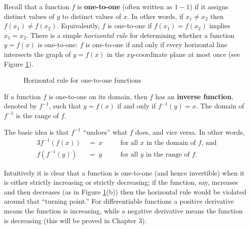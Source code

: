 Recall that a function $f$ is \textbf{one-to-one} (often
written as $1-1$) if it assigns distinct values of $y$ to distinct values of
$x$. In other words, if $x_1 \ne x_2$ then $f(x_1 ) \ne f(x_2 )$. Equivalently,
$f$ is one-to-one if $f(x_1 ) = f(x_2 )$ implies $x_1 = x_2$. There is a simple
\emph{horizontal rule} for determining whether a function $y=f(x)$ is
one-to-one: $f$ is one-to-one if and only if every horizontal line intersects
the graph of $y=f(x)$ in the $xy$-coordinate plane at most once (see
Figure \ref{fig:horizontalrule}).
\newpage
\begin{figure}[h]
 \centering
 \qquad\qquad
 \vspace{-2mm}
 \caption[]{\quad Horizontal rule for one-to-one functions}
 \label{fig:horizontalrule}
\end{figure}

If a function $f$ is one-to-one on its domain, then $f$ has an
\textbf{inverse function}, denoted by $f^{-1}$, such that $y=f(x)$ if and only
if $f^{-1}(y) = x$. The domain of $f^{-1}$ is the range of
$f$.

The basic idea is that $f^{-1}$ ``undoes'' what $f$ does, and vice versa. In
other words,
\begin{alignat*}{3}
 f^{-1}(f(x)) ~&=~ x \quad&&\text{for all $x$ in the domain of $f$, and}\\
 f(f^{-1}(y)) ~&=~ y \quad&&\text{for all $y$ in the range of $f$.}
\end{alignat*}

Intuitively it is clear that a function is one-to-one (and hence invertible)
when it is either strictly increasing or strictly decreasing; if the function,
say, increases and then decreases (as in Figure \ref{fig:horizontalrule}(b))
then the horizontal rule would be violated around that ``turning point.'' For
differentiable functions a positive derivative means the function is increasing,
while a negative derivative means the function is decreasing (this will be
proved in Chapter 3).

